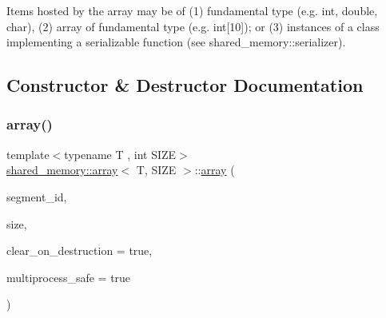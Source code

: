 Items hosted by the array may be of (1) fundamental type (e.\+g. int, double, char), (2) array of fundamental type (e.\+g. int\mbox{[}10\mbox{]}); or (3) instances of a class implementing a serializable function (see shared\+\_\+memory\+::serializer). 

\subsection{Constructor \& Destructor Documentation}
\mbox{\label{classshared__memory_1_1array_a95b5abd158cb04ab0644f5aa6df48b2b}} 
\subsubsection{\texorpdfstring{array()}{array()}\hspace{0.1cm}{\footnotesize\ttfamily [1/2]}}
{\footnotesize\ttfamily template$<$typename T , int S\+I\+ZE$>$ \\
\hyperlink{classshared__memory_1_1array}{shared\+\_\+memory\+::array}$<$ T, S\+I\+ZE $>$\+::\hyperlink{classshared__memory_1_1array}{array} (\begin{DoxyParamCaption}\item[{std\+::string}]{segment\+\_\+id,  }\item[{std\+::size\+\_\+t}]{size,  }\item[{bool}]{clear\+\_\+on\+\_\+destruction = {\ttfamily true},  }\item[{bool}]{multiprocess\+\_\+safe = {\ttfamily true} }\end{DoxyParamCaption})}


